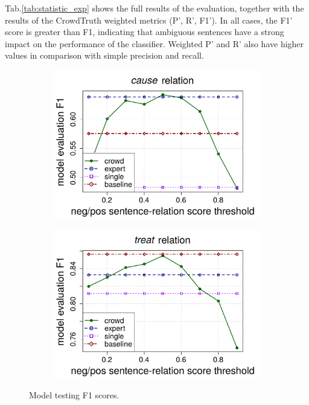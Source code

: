 Tab.\ref{tab:statistic_exp} shows the full results of the evaluation, together with the results of the CrowdTruth weighted metrics (P', R', F1'). In all cases, the F1' score is greater than F1, indicating that ambiguous sentences have a strong impact on the performance of the classifier. Weighted P' and R' also have higher values in comparison with simple precision and recall.

\begin{figure}[htb!]
\centering
\begin{subfigure}{.5\textwidth}
\includegraphics[width=\linewidth]{img/cause_expert.pdf}
\end{subfigure}%
\begin{subfigure}{.5\textwidth}
\includegraphics[width=\linewidth]{img/treat_expert.pdf}
\end{subfigure}
\caption{Model testing F1 scores.}
\label{fig:exp_f1}
\end{figure}

